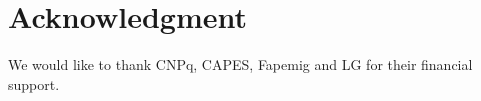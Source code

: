 \section*{Acknowledgment}

We would like to thank CNPq, CAPES, Fapemig and LG for their financial support.
 
